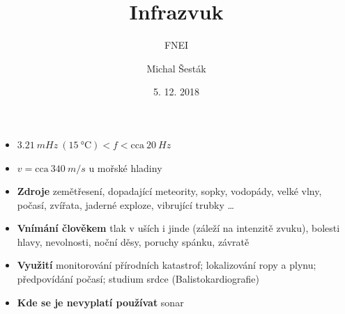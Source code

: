 \documentclass[10pt, frame]{beamer}
\author{Michal Šesták}
\title{Infrazvuk}
\subtitle{FNEI}
\institute{}
\date{5. 12. 2018}
\begin{document}
\renewcommand{\figurename}{Obr.}
\renewcommand{\tablename}{Tab.}

\maketitle


\begin{frame}
    \begin{itemize}
        \item $\SI{3,21}{mHz}\ (\SI{15}{\celsius})<f< \text{cca}\ \SI{20}{Hz}$ 
        \item $v=\text{cca}\ \SI{340}{m/s}$ u mořské hladiny
        \item \textbf{Zdroje} zemětřesení, dopadající meteority, sopky, vodopády, velké vlny, počasí, zvířata, jaderné exploze, vibrující trubky \dots
        \item \textbf{Vnímání člověkem} tlak v uších i jinde (záleží na intenzitě zvuku), bolesti hlavy, nevolnosti, noční děsy, poruchy spánku, závratě 
        \item \textbf{Využití} monitorování přírodních katastrof; lokalizování ropy a plynu; předpovídání počasí; studium srdce (Balistokardiografie)
        \item \textbf{Kde se je nevyplatí používat} sonar
    \end{itemize}
\end{frame}
\end{document}
